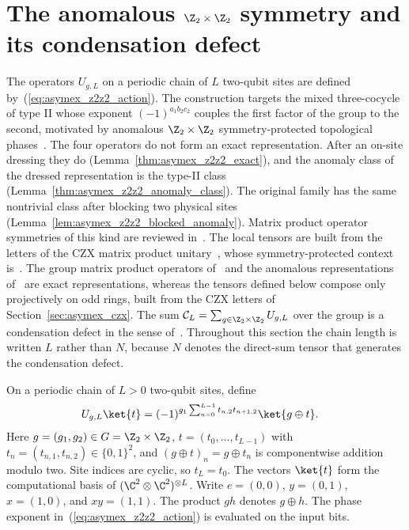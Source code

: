 
\section{The anomalous \texorpdfstring{$\Z_2\times\Z_2$}{Z2 x Z2} symmetry and its condensation defect}%
\label{sec:asymex_z2z2}

The operators $U_{g,L}$ on a periodic chain of $L$ two-qubit sites are
defined by~(\ref{eq:asymex_z2z2_action}). The construction targets the mixed
three-cocycle of type II whose exponent $(-1)^{a_1b_2c_2}$ couples the first
factor of the group to the second, motivated by anomalous
$\Z_2\times\Z_2$ symmetry-protected topological phases~\cite{ChenGuWen2011}.
The four operators do not form an exact representation. After an on-site
dressing they do (Lemma~\ref{thm:asymex_z2z2_exact}), and the anomaly
class of the dressed representation is the type-II class
(Lemma~\ref{thm:asymex_z2z2_anomaly_class}). The original family has the
same nontrivial class after blocking two physical sites
(Lemma~\ref{lem:asymex_z2z2_blocked_anomaly}).
Matrix product operator symmetries of this kind are reviewed
in~\cite[Section~III.A.6]{Cirac2021Matrix}. The local tensors are built from
the letters of the CZX matrix product
unitary~\cite[Appendix~A, ``The CZX MPU'']{Cirac2021Matrix}, whose
symmetry-protected context is~\cite[Section~III.B.1]{Cirac2021Matrix}. The
group matrix product operators of~\cite{GarreRubio2023MPOSym} and the
anomalous representations of~\cite{GarreRubioSchuch2024DomainWall} are exact representations, whereas the
tensors defined below compose only projectively on odd rings, built from the CZX
letters of Section~\ref{sec:asymex_czx}. The sum
$\mathcal C_L = \sum_{g\in\Z_2\times\Z_2} U_{g,L}$ over the group is a
condensation defect in the sense of~\cite{Roumpedakis2023Condensation}.
Throughout this section the chain length is written $L$ rather than $N$,
because $N$ denotes the direct-sum tensor that generates the condensation defect.

On a periodic chain of $L>0$ two-qubit sites, define
\begin{align}
    U_{g,L}\ket{t}
     & =(-1)^{g_1\sum_{n=0}^{L-1}t_{n,2}t_{n+1,2}}
    \ket{g\oplus t}.
    \label{eq:asymex_z2z2_action}
\end{align}
Here $g=(g_1,g_2)\in G=\Z_2\times\Z_2$,
$t=(t_0,\ldots,t_{L-1})$ with $t_n=(t_{n,1},t_{n,2})\in\{0,1\}^2$,
and $(g\oplus t)_n=g\oplus t_n$ is componentwise addition modulo two.
Site indices are cyclic, so $t_L=t_0$.
The vectors $\ket{t}$ form the computational basis of
$(\C^2\otimes\C^2)^{\otimes L}$.
Write $e=(0,0)$, $y=(0,1)$, $x=(1,0)$, and $xy=(1,1)$.
The product $gh$ denotes $g\oplus h$.
The phase exponent in~(\ref{eq:asymex_z2z2_action}) is evaluated
on the input bits.

